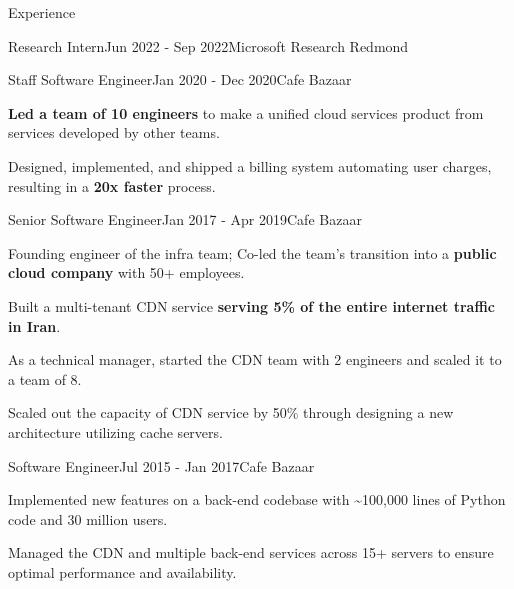 \documentclass[
	10pt, %
]{resume} %
\begin{document}
\begin{rSection}{Experience}
\begin{rSubsection}{Research Intern}{Jun 2022 - Sep 2022}{Microsoft Research Redmond}{}
	\end{rSubsection}

  \begin{rSubsection}{Staff Software Engineer}{Jan 2020 - Dec 2020}{Cafe Bazaar}{}

    \item \textbf{Led a team of 10 engineers} to make a uniﬁed cloud services product
      from services developed by other teams.

    \item Designed, implemented, and shipped a billing system automating user
      charges, resulting in a \textbf{20x faster} process.

  \end{rSubsection}

  \begin{rSubsection}{Senior Software Engineer}{Jan 2017 - Apr 2019}{Cafe Bazaar}{}

    \item Founding engineer of the infra team;
      Co-led the team's transition into a
      \textbf{public cloud company} with 50+ employees.

    \item Built a multi-tenant CDN service \textbf{serving 5\% of the entire internet traffic in Iran}.

    \item As a technical manager, started the CDN team with 2 engineers and scaled it to a 
      team of 8.


    \item Scaled out the capacity of CDN service by 50\% through designing a new
      architecture utilizing cache servers.

  \end{rSubsection}

  \begin{rSubsection}{Software Engineer}{Jul 2015 - Jan 2017}{Cafe Bazaar}{}
    
    \item Implemented new features on a back-end codebase with \textasciitilde 100,000 lines
      of Python code and 30 million users.

    \item Managed the CDN and multiple back-end services across 15+ servers to
      ensure optimal performance and availability.

  \end{rSubsection}

\end{rSection}
\end{document}
